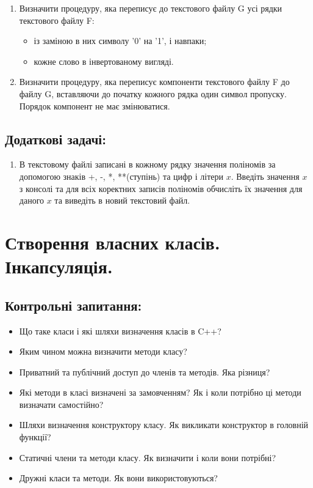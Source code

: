 \documentclass[a5paper,titlepage,openany,twoside,draft]{book_unv}%
\begin{document}
\begin{enumerate}
\item
Визначити процедуру, яка переписує до текстового файлу G усі 
рядки текстового файлу F:
\begin{itemize}
\item із заміною в них символу '0' на '1', і навпаки;
\item кожне слово в інвертованому вигляді.
\end{itemize}

\item
Визначити процедуру, яка переписує компоненти текстового 
файлу F до файлу G, вставляючи до початку кожного рядка один символ пропуску.
Порядок компонент не має змінюватися.
\end{enumerate}


\section{Додаткові задачі:}

\begin{enumerate}
\def\labelenumi{\arabic{enumi})}
\setcounter{enumi}{26}
\item
  В текстовому файлі записані в кожному рядку значення поліномів за
  допомогою знаків +, -, *, **(ступінь) та цифр і літери $x$. Введіть
  значення $x$ з консолі та для всіх коректних записів поліномів обчисліть
  їх значення для даного $x$ та виведіть в новий текстовий файл.
\end{enumerate}


\chapter{Створення власних класів. Інкапсуляція.}
%

\section{Контрольні запитання:}
\begin{itemize}
\item
Що таке класи і які шляхи визначення класів в C++?
\item
Яким чином можна визначити методи класу?
\item
Приватний та публічний доступ до членів та методів. Яка різниця?
\item
Які методи в класі визначені за замовченням? Як і коли потрібно ці
методи визначати самостійно?
\item 
Шляхи визначення конструктору класу. Як викликати конструктор в
головній функції?
\item
Статичні члени та методи класу. Як визначити і коли вони потрібні?
\item 
Дружні класи та методи. Як вони використовуються?
\end{itemize}
\end{document}

